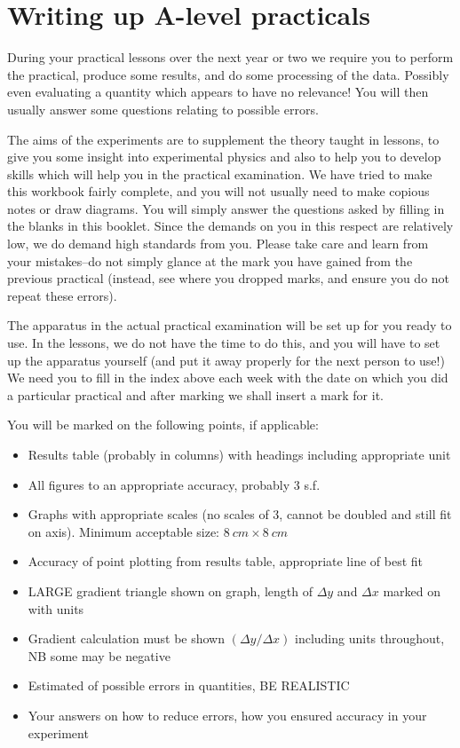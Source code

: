 \documentclass[a4paper,12pt,twoside]{exam}
\begin{document}
\section*{Writing up A-level practicals}

During your practical lessons over the next year or two we require you to perform the practical, produce some results, and do some processing of the data.  Possibly even evaluating a quantity which appears to have no relevance!  You will then usually answer some questions relating to possible errors.

The aims of the experiments are to supplement the theory taught in lessons, to give you some insight into experimental physics and also to help you to develop skills which will help you in the practical examination.  We have tried to make this workbook fairly complete, and you will not usually need to make copious notes or draw diagrams.  You will simply answer the questions asked by filling in the blanks in this booklet.  Since the demands on you in this respect are relatively low, we do demand high standards from you. Please take care and learn from your mistakes--do not simply glance at the mark you have gained from the previous practical (instead, see where you dropped marks, and ensure you do not repeat these errors).

The apparatus in the actual practical examination will be set up for you ready to use.  In the lessons, we do not have the time to do this, and you will have to set up the apparatus yourself (and put it away properly for the next person to use!)  We need you to fill in the index above each week with the date on which you did a particular practical and after marking we shall insert a mark for it.

You will be marked on the following points, if applicable:
\begin{itemize}
\setlength{\itemsep}{1pt}
  \setlength{\parskip}{0pt}
  \setlength{\parsep}{0pt}
\item Results table (probably in columns) with headings including appropriate unit
\item All figures to an appropriate accuracy, probably 3 s.f.
\item Graphs with appropriate scales (no scales of 3, cannot be doubled and still fit on axis). Minimum acceptable size: $\SI{8}{cm}\times\SI{8}{cm}$
\item Accuracy of point plotting from results table, appropriate line of best fit
\item LARGE gradient triangle shown on graph, length of $\Delta y$ and $\Delta x$ marked on with units
\item Gradient calculation must be shown $(\Delta y/\Delta x)$ including units throughout, NB some may be negative
\item Estimated of possible errors in quantities, BE REALISTIC
\item Your answers on how to reduce errors, how you ensured accuracy in your experiment
\end{itemize}
\end{document}
